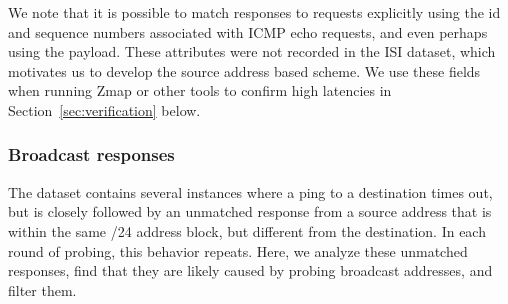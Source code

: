 We note that it is possible to match responses to requests
explicitly using the id and sequence numbers associated with
ICMP echo requests, and even perhaps using the payload.
These attributes were not recorded in the ISI dataset, which
motivates us to develop the source address based scheme.  We
use these fields when running Zmap or other tools to confirm
high latencies in Section~\ref{sec:verification} below.



% 



\subsubsection{Broadcast responses}

The dataset contains several instances where a ping to a
destination times out, but is closely followed by an
unmatched response from a source address that is within the same /24
address block, but different from the destination.
In each round of probing, this behavior repeats.
%
Here, we analyze these unmatched responses, find that they are likely
caused by probing broadcast addresses, and filter them.

